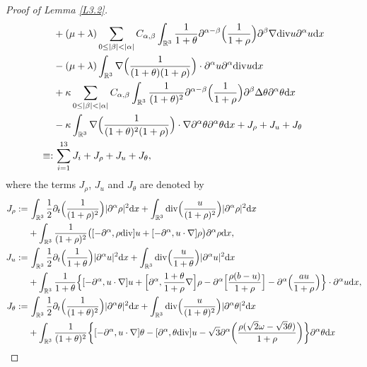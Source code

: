 \documentclass[reqno,11pt]{amsart}
\theoremstyle{plain}
\numberwithin{equation}{section}
\begin{document}
\begin{proof}[Proof of Lemma \ref{L3.2}]
\begin{align}
&+(\mu+\lambda)\sum_{0\leq|\beta|<|\alpha|} C_{\alpha,\beta}\int_{\mathbb{R}^3}\frac{1}{1+\theta}\partial^{\alpha-\beta}\Big( \frac{1}{1+\rho} \Big)\partial^\beta\nabla{\rm div}  u\partial^\alpha u {\rm d}x\nonumber\\
&-(\mu+\lambda)\int_{\mathbb{R}^3} \nabla\Big(\frac{1}{(1+\theta)(1+\rho)} \Big)\cdot \partial^\alpha u  \partial^\alpha{\rm div}  u {\rm d}x \nonumber\\
&+\kappa\sum_{0\leq|\beta|<|\alpha|} C_{\alpha,\beta}\int_{\mathbb{R}^3}\frac{1}{(1+\theta)^2}\partial^{\alpha-\beta}\Big( \frac{1}{1+\rho} \Big)\partial^\beta\Delta \theta \partial^\alpha \theta {\rm d}x\nonumber\\
&-\kappa\int_{\mathbb{R}^3} \nabla\Big(\frac{1}{(1+\theta)^2(1+\rho)} \Big)\cdot\nabla\partial^\alpha \theta  \partial^\alpha \theta {\rm d}x  +J_\rho+J_u+J_\theta \nonumber\\
\equiv:&\,\sum_{i=1}^{13}J_{i}+ J_\rho+J_u+J_\theta,
 \end{align}
where the terms $J_\rho$, $J_u$ and $J_\theta$ are denoted by
\begin{align*} 
J_\rho:=&\,\int_{\mathbb{R}^3}\frac{1}{2}\partial_t \Big(\frac{1}{(1+\rho)^2} \Big) |\partial^\alpha\rho|^2{\rm d}x+\int_{\mathbb{R}^3} {\rm div}\Big( \frac{u}{(1+\rho)^2}\Big)   |\partial^\alpha\rho|^2{\rm d}x  \nonumber\\
&+\int_{\mathbb{R}^3} \frac{1}{(1+\rho)^2} \big([-\partial^\alpha, \rho {\rm div}  ] u+ [-\partial^\alpha, u \cdot \nabla   ] \rho \big)\partial^\alpha\rho{\rm d}x, \\
J_u:=&\, \int_{\mathbb{R}^3}\frac{1}{2}\partial_t \Big(\frac{1}{1+\theta } \Big) |\partial^\alpha u|^2{\rm d}x+\int_{\mathbb{R}^3} {\rm div}\Big( \frac{u}{1+\theta }\Big)   |\partial^\alpha u|^2{\rm d}x  \nonumber\\
&+\int_{\mathbb{R}^3} \frac{1}{1+\theta} \Big\{[-\partial^\alpha,u\cdot\nabla] u+  \Big[\partial^\alpha,  \frac{1+\theta}{1+\rho}\nabla\Big] \rho-\partial^\alpha\Big [ \frac{\rho(b-u)}{1+\rho} \Big]  -\partial^\alpha \Big(  \frac{   au}{1+\rho}  \Big)\Big\}\cdot\partial^\alpha u{\rm d}x,\\ 
J_\theta:=&\,\int_{\mathbb{R}^3}\frac{1}{2}\partial_t \Big(\frac{1}{(1+\theta)^2} \Big) |\partial^\alpha\theta|^2{\rm d}x+\int_{\mathbb{R}^3} {\rm div}\Big( \frac{u}{(1+\theta)^2}\Big)   |\partial^\alpha\theta|^2{\rm d}x  \nonumber\\
&+\int_{\mathbb{R}^3}\frac{1}{(1+\theta)^2}\bigg\{[-\partial^\alpha, u\cdot\nabla]\theta-[\partial^\alpha, \theta{\rm div}]u -\sqrt{3}\partial^\alpha\bigg( \frac{\rho(\sqrt{2}\omega-\sqrt{3}\theta)}{1+\rho}   \bigg)\bigg\}\partial^\alpha\theta{\rm d}x\nonumber\\

\end{align*}
\end{proof}
\end{document}
